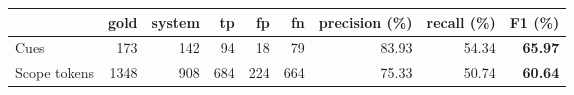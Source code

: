 \begin{tabular}{lrrrrrrrr}
\toprule
{}           & gold & system &  tp &  fp &  fn & precision (\%) & recall (\%) & F1 (\%) \\
\midrule
Cues         &  173 &    142 &  94 &  18 &  79 &          83.93 &       54.34 &   \textbf{65.97} \\
Scope tokens & 1348 &    908 & 684 & 224 & 664 &          75.33 &       50.74 &   \textbf{60.64} \\
\bottomrule
\end{tabular}